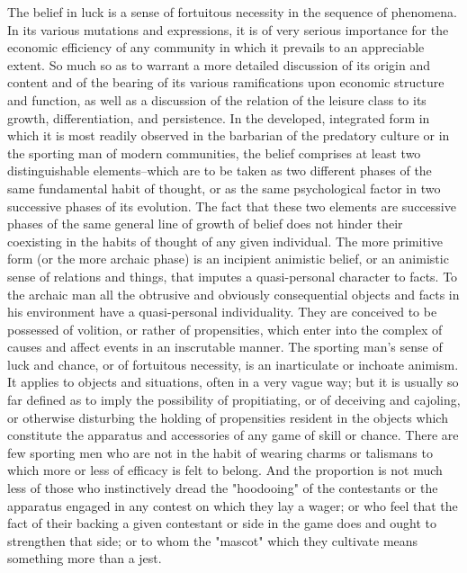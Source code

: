 \documentclass[12pt]{report}
\begin{document}
The belief in luck is a sense of fortuitous necessity in the sequence
of phenomena. In its various mutations and expressions, it is of very
serious importance for the economic efficiency of any community in which
it prevails to an appreciable extent. So much so as to warrant a more
detailed discussion of its origin and content and of the bearing of its
various ramifications upon economic structure and function, as well as
a discussion of the relation of the leisure class to its growth,
differentiation, and persistence. In the developed, integrated form
in which it is most readily observed in the barbarian of the predatory
culture or in the sporting man of modern communities, the belief
comprises at least two distinguishable elements--which are to be taken
as two different phases of the same fundamental habit of thought, or as
the same psychological factor in two successive phases of its evolution.
The fact that these two elements are successive phases of the same
general line of growth of belief does not hinder their coexisting in the
habits of thought of any given individual. The more primitive form
(or the more archaic phase) is an incipient animistic belief, or an
animistic sense of relations and things, that imputes a quasi-personal
character to facts. To the archaic man all the obtrusive and obviously
consequential objects and facts in his environment have a quasi-personal
individuality. They are conceived to be possessed of volition, or rather
of propensities, which enter into the complex of causes and affect
events in an inscrutable manner. The sporting man's sense of luck and
chance, or of fortuitous necessity, is an inarticulate or inchoate
animism. It applies to objects and situations, often in a very vague
way; but it is usually so far defined as to imply the possibility of
propitiating, or of deceiving and cajoling, or otherwise disturbing the
holding of propensities resident in the objects which constitute the
apparatus and accessories of any game of skill or chance. There are few
sporting men who are not in the habit of wearing charms or talismans to
which more or less of efficacy is felt to belong. And the proportion is
not much less of those who instinctively dread the "hoodooing" of the
contestants or the apparatus engaged in any contest on which they lay a
wager; or who feel that the fact of their backing a given contestant or
side in the game does and ought to strengthen that side; or to whom the
"mascot" which they cultivate means something more than a jest.
\end{document}
